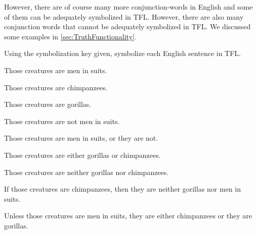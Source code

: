 However, there are of course many more conjunction-words in English and some of them can be adequately symbolized in TFL. However, there are also many conjunction words that cannot be adequately symbolized in TFL. We discussed some examples in \cref{sec:TruthFunctionality}.



\begin{practiceproblems}
\problempart Using the symbolization key given, symbolize each English sentence in TFL.\label{pr:monkeysuits}
	\begin{ekey}
		\item[M] Those creatures are men in suits.
		\item[C] Those creatures are chimpanzees.
		\item[G] Those creatures are gorillas.
	\end{ekey}
\begin{problemslist}
\item Those creatures are not men in suits.
\item Those creatures are men in suits, or they are not.
\item Those creatures are either gorillas or chimpanzees.
\item Those creatures are neither gorillas nor chimpanzees.
\item If those creatures are chimpanzees, then they are neither gorillas nor men in suits.
\item Unless those creatures are men in suits, they are either chimpanzees or they are gorillas.
\end{problemslist}


\end{practiceproblems}

